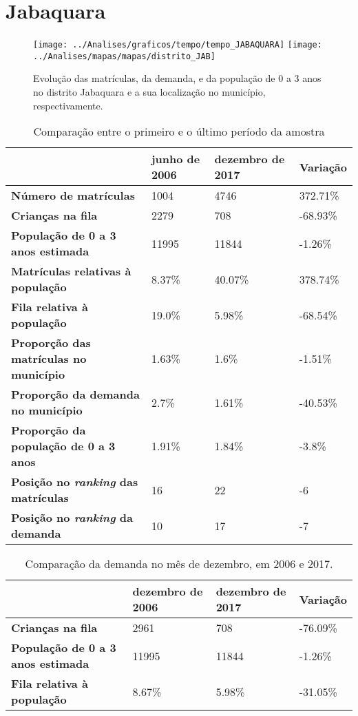 \section{Jabaquara}
\begin{figure}[H]
	\centering
	\texttt{[image: ../Analises/graficos/tempo/tempo\_JABAQUARA]}
	\texttt{[image: ../Analises/mapas/mapas/distrito\_JAB]}
	\caption{Evolução das matrículas, da demanda, e da população de 0 a 3 anos no distrito Jabaquara e a sua localização no município, respectivamente.}
\end{figure}
\begin{table}[H]
	\begin{tabular}{|l|l|l|l|}
		\hline
		\textbf{}                                      & \textbf{junho de 2006}       & \textbf{dezembro de 2017}    & \textbf{Variação} \\ \hline
		\textbf{Número de matrículas}                  & 1004 & 4746 & 372.71\% \\ \hline
		\textbf{Crianças na fila}                      & 2279 & 708 & -68.93\% \\ \hline
		\textbf{População de 0 a 3 anos estimada}      & 11995 & 11844 & -1.26\% \\ \hline
		\textbf{Matrículas relativas à população}      & 8.37\% & 40.07\% & 378.74\% \\ \hline
		\textbf{Fila relativa à população}             & 19.0\% & 5.98\% & -68.54\% \\ \hline
		\textbf{Proporção das matrículas no município} & 1.63\% & 1.6\% & -1.51\% \\ \hline
		\textbf{Proporção da demanda no município}     & 2.7\% & 1.61\% & -40.53\% \\ \hline
		\textbf{Proporção da população de 0 a 3 anos}  & 1.91\% & 1.84\% & -3.8\% \\ \hline
		\textbf{Posição no \textit{ranking} das matrículas}     & 16 & 22 & -6 \\ \hline
		\textbf{Posição no \textit{ranking} da demanda}         & 10 & 17 & -7 \\ \hline
	\end{tabular}
	\caption{Comparação entre o primeiro e o último período da amostra}
\end{table}
\begin{table}[H]
	\begin{tabular}{|l|l|l|l|}
		\hline
		\textbf{}                                 & \textbf{dezembro de 2006} & \textbf{dezembro de 2017} & \textbf{Variação} \\ \hline
		\textbf{Crianças na fila}                      & 2961 & 708 & -76.09\% \\ \hline
		\textbf{População de 0 a 3 anos estimada}      & 11995 & 11844 & -1.26\% \\ \hline
		\textbf{Fila relativa à população}             & 8.67\% & 5.98\% & -31.05\% \\ \hline
	\end{tabular}
	\caption{Comparação da demanda no mês de dezembro, em 2006 e 2017.}
\end{table}
